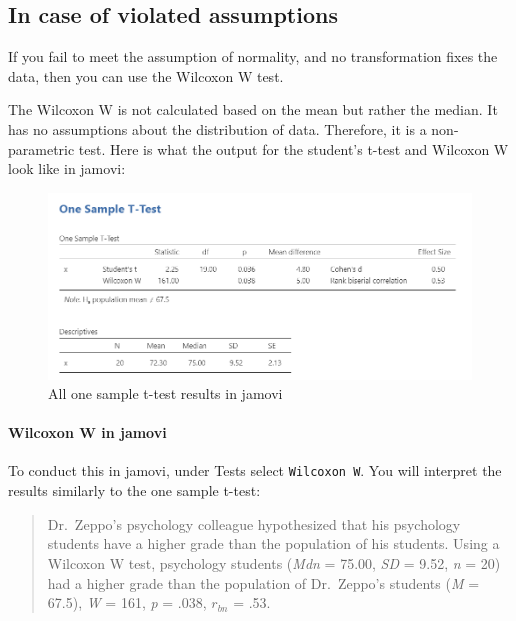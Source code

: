 \documentclass[
]{book}
\begin{document}
\hypertarget{in-case-of-violated-assumptions}{%
\subsection{In case of violated assumptions}\label{in-case-of-violated-assumptions}}

If you fail to meet the assumption of normality, and no transformation fixes the data, then you can use the Wilcoxon W test.

The Wilcoxon W is not calculated based on the mean but rather the median. It has no assumptions about the distribution of data. Therefore, it is a non-parametric test. Here is what the output for the student's t-test and Wilcoxon W look like in jamovi:

\begin{figure}

{\centering \includegraphics[width=1\linewidth]{images/07.1-one_sample_t-test/wilcoxon} 

}

\caption{All one sample t-test results in jamovi}\label{fig:unnamed-chunk-8}
\end{figure}

\hypertarget{wilcoxon-w-in-jamovi}{%
\paragraph{Wilcoxon W in jamovi}\label{wilcoxon-w-in-jamovi}}

To conduct this in jamovi, under Tests select \texttt{Wilcoxon\ W}. You will interpret the results similarly to the one sample t-test:

\begin{quote}
Dr.~Zeppo's psychology colleague hypothesized that his psychology students have a higher grade than the population of his students. Using a Wilcoxon W test, psychology students (\emph{Mdn} = 75.00, \emph{SD} = 9.52, \emph{n} = 20) had a higher grade than the population of Dr.~Zeppo's students (\emph{M} = 67.5), \emph{W} = 161, \emph{p} = .038, \(r_{bn}\) = .53.
\end{quote}
\end{document}
